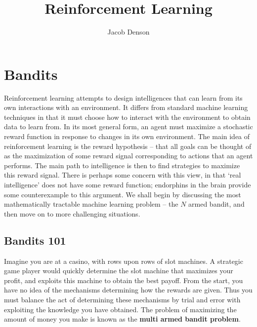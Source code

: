 

\title{Reinforcement Learning}
\author{Jacob Denson}



\maketitle
\tableofcontents
{}

\newpage

\part{Bandits}

Reinforcement learning attempts to design intelligences that can learn from its own interactions with an environment. It differs from standard machine learning techniques in that it must choose how to interact with the environment to obtain data to learn from. In its most general form, an agent must maximize a stochastic reward function in response to changes in its own environment. The main idea of reinforcement learning is the reward hypothesis -- that all goals can be thought of as the maximization of some reward signal corresponding to actions that an agent performs. The main path to intelligence is then to find strategies to maximize this reward signal. There is perhaps some concern with this view, in that `real intelligence' does not have some reward function; endorphins in the brain provide some counterexample to this argument. We shall begin by discussing the most mathematically tractable machine learning problem -- the $N$ armed bandit, and then move on to more challenging situations.

\chapter{Bandits 101}

Imagine you are at a casino, with rows upon rows of slot machines. A strategic game player would quickly determine the slot machine that maximizes your profit, and exploits this machine to obtain the best payoff. From the start, you have no idea of the mechanisms determining how the rewards are given. Thus you must balance the act of determining these mechanisms by trial and error with exploiting the knowledge you have obtained. The problem of maximizing the amount of money you make is known as the {\bf multi armed bandit problem}.

